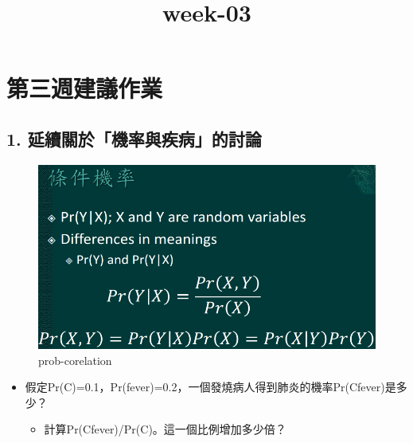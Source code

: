 \documentclass[11pt]{article}
\title{week-03}
\providecommand{\tightlist}{%
      \setlength{\itemsep}{0pt}\setlength{\parskip}{0pt}}
\begin{document}
    
    \maketitle
    
    

    
    \hypertarget{ux7b2cux4e09ux9031ux5efaux8b70ux4f5cux696d}{%
\section{第三週建議作業}\label{ux7b2cux4e09ux9031ux5efaux8b70ux4f5cux696d}}

    \hypertarget{ux5ef6ux7e8cux95dcux65bcux6a5fux7387ux8207ux75beux75c5ux7684ux8a0eux8ad6}{%
\subsection{1.
延續關於「機率與疾病」的討論}\label{ux5ef6ux7e8cux95dcux65bcux6a5fux7387ux8207ux75beux75c5ux7684ux8a0eux8ad6}}

\begin{figure}
\centering
\includegraphics{prob-corelation.png}
\caption{prob-corelation}
\end{figure}

\begin{itemize}
\tightlist
\item
  假定Pr(C)=0.1，Pr(fever)=0.2，一個發燒病人得到肺炎的機率Pr(C\textbar fever)是多少？

  \begin{itemize}
  \tightlist
  \item
    計算Pr(C\textbar fever)/Pr(C)。這一個比例增加多少倍？
  \end{itemize}
\end{itemize}
\end{document}
